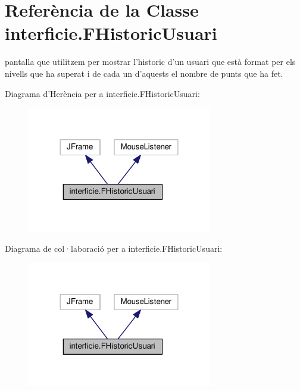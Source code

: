 \hypertarget{classinterficie_1_1_f_historic_usuari}{\section{Referència de la Classe interficie.\+F\+Historic\+Usuari}
\label{classinterficie_1_1_f_historic_usuari}
}


pantalla que utilitzem per mostrar l'historic d'un usuari que està format per els nivells que ha superat i de cada un d'aquests el nombre de punts que ha fet.  




Diagrama d'Herència per a interficie.\+F\+Historic\+Usuari\+:\nopagebreak
\begin{figure}[H]
\begin{center}
\leavevmode
\includegraphics[width=228pt]{classinterficie_1_1_f_historic_usuari__inherit__graph}
\end{center}
\end{figure}


Diagrama de col·laboració per a interficie.\+F\+Historic\+Usuari\+:\nopagebreak
\begin{figure}[H]
\begin{center}
\leavevmode
\includegraphics[width=228pt]{classinterficie_1_1_f_historic_usuari__coll__graph}
\end{center}
\end{figure}

